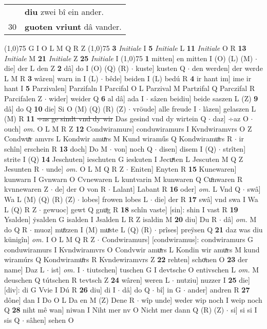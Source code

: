 \documentclass[8pt,a4paper,notitlepage]{article}
\begin{document}
\begin{table}[ht]
\begin{minipage}[t]{0.5\linewidth}
\begin{tabular}{rl}
 & \textbf{diu} zwei bî ein ander.\\ 
30 & \textbf{guoten vriunt} dâ vander.\\ 
\end{tabular}
\scriptsize
\line(1,0){75} \newline
G I O L M Q R Z \newline
\line(1,0){75} \newline
\textbf{3} \textit{Initiale} I  \textbf{5} \textit{Initiale} L  \textbf{11} \textit{Initiale} O R  \textbf{13} \textit{Initiale} M  \textbf{21} \textit{Initiale} Z  \textbf{25} \textit{Initiale} I  \newline
\line(1,0){75} \newline
\textbf{1} mitten] en mitten I (O) (L) (M)  $\cdot$ die] der L den Z \textbf{2} dâ] do I (O) (Q) (R)  $\cdot$ kuste] kusten Q  $\cdot$ den werden] der werde L M R \textbf{3} wâren] warn in I (L)  $\cdot$ bêde] beiden I (L) bedú R \textbf{4} ir hant im] ime ir hant I \textbf{5} Parzivalen] Parzifaln I Parcifal O L Parzival M Partzifal Q Parczifal R Parcifalen Z  $\cdot$ wider] weider Q \textbf{6} al dâ] ada I  $\cdot$ sâzen beidiu] beide saszen L (Z) \textbf{9} dâ] do Q \textbf{10} die] Si O (M) (Q) (R) (Z)  $\cdot$ vröude] alle freude I  $\cdot$ lâzen] gelaszen L (M) R \textbf{11} \sout{÷as ge sindt vnd dy wir} Das gesind vnd dy wirtein Q  $\cdot$ daz] ÷az O  $\cdot$ ouch] \textit{om.} O L M R Z \textbf{12} Condwiramurs] conduwiramurs I Kvndwiramvrs O Z Condwuͯr amvrs L Kondwir amuͯrs M Kund wiraműs Q Kondwiramuͦrs R  $\cdot$ ir schîn] erschein R \textbf{13} doch] Do M  $\cdot$ von] noch Q  $\cdot$ disen] disem I (Q)  $\cdot$ strîten] strite I (Q) \textbf{14} Jeschuten] ieschuten G ieskuten I Jecuͯten L Jescuten M Q Z Jesunten R  $\cdot$ unde] \textit{om.} O L M Q R Z  $\cdot$ Eniten] Enyten R \textbf{15} Kunewaren] kunwarn I Gvnwarn O Cvnewaren L kuntvarin M kunwaren Q Cuͦnwaren R kvnnewaren Z  $\cdot$ de] der O von R  $\cdot$ Lalant] Labant R \textbf{16} oder] \textit{om.} L Vnd Q  $\cdot$ swâ] Wa L (M) (Q) (R) (Z)  $\cdot$ lobes] frowen lobes L  $\cdot$ die] der R \textbf{17} swâ] vnd swa I Wa L (Q) R Z  $\cdot$ gewuoc] gewt Q gnuͦg R \textbf{18} schîn vaste] [sin]: shin I vast R \textbf{19} Ysalden] ẏsalden G isalden I Jsalden L R Z isaldin M \textbf{20} diu] Du R  $\cdot$ dâ] \textit{om.} M do Q R  $\cdot$ muoz] muͤzzen I (M) muͯste L (Q) (R)  $\cdot$ prîses] preÿsen Q \textbf{21} daz was diu künigîn] \textit{om.} I O L M Q R Z  $\cdot$ Condwiramurs] [condwiramus]: condwiramurs G conduwiramurs I Kvndwiramvrs O Condvwir amuͯrs L Kondin wir amuͯrs M kund wiramúrs Q Kondwiramuͦrs R Kvndewiramvrs Z \textbf{22} rehten] schoͤnen O \textbf{23} der name] Daz L  $\cdot$ ist] \textit{om.} I  $\cdot$ tiutschen] tuschen G I devtsche O entivschen L \textit{om.} M deuschen Q tútschen R tevtsch Z \textbf{24} wâren] weren L  $\cdot$ nutziu] nuzzer I \textbf{25} die] [div]: di G Vvie I Dú R \textbf{26} diu] di I  $\cdot$ dâ] do Q  $\cdot$ bî] in G  $\cdot$ ander] andren R \textbf{27} dône] dan I Do O L Da en M (Z) Dene R  $\cdot$ wîp unde] weder wip noch I weip noch Q \textbf{28} niht mê wan] niwan I Niht mer nv O Nicht mer dann Q (R) (Z)  $\cdot$ si] si si I sis Q  $\cdot$ sâhen] sehen O 
\end{minipage}
\end{table}
\end{document}
